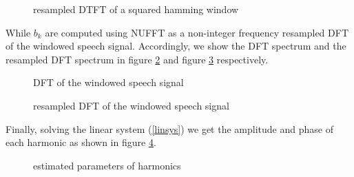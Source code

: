 \documentclass[dvips]{article}
\begin{document}
\begin{figure}[H]
\centering

\caption{resampled DTFT of a squared hamming window}
\label{fig:rl}
\end{figure}

While $b_k$ are computed using NUFFT as a non-integer frequency resampled DFT of the windowed speech signal. Accordingly, we show the DFT spectrum and the resampled DFT spectrum in figure \ref{fig:dftsig} and figure \ref{fig:resampdftsig} respectively.

\begin{figure}[H]
\centering

\caption{DFT of the windowed speech signal}
\label{fig:dftsig}
\end{figure}

\begin{figure}[H]
\centering

\caption{resampled DFT of the windowed speech signal}
\label{fig:resampdftsig}
\end{figure}

Finally, solving the linear system (\ref{linsys}) we get the amplitude and phase of each harmonic as shown in figure \ref{fig:harest}.

\begin{figure}[H]
\centering

\caption{estimated parameters of harmonics}
\label{fig:harest}
\end{figure}
\end{document}
